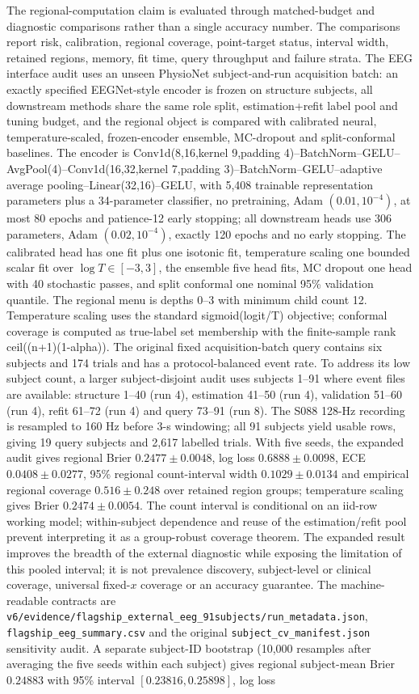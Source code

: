 \documentclass[11pt,a4paper]{article}
\numberwithin{equation}{section}
\theoremstyle{definition}\newtheorem{definition}[theorem]{Definition}
\theoremstyle{remark}\newtheorem{remark}[theorem]{Remark}
\begin{document}
The regional-computation claim is evaluated through matched-budget and diagnostic comparisons rather than a single accuracy number. The comparisons report risk, calibration, regional coverage, point-target status, interval width, retained regions, memory, fit time, query throughput and failure strata. The EEG interface audit uses an unseen PhysioNet subject-and-run acquisition batch: an exactly specified EEGNet-style encoder is frozen on structure subjects, all downstream methods share the same role split, estimation+refit label pool and tuning budget, and the regional object is compared with calibrated neural, temperature-scaled, frozen-encoder ensemble, MC-dropout and split-conformal baselines. The encoder is Conv1d(8,16,kernel 9,padding 4)--BatchNorm--GELU--AvgPool(4)--Conv1d(16,32,kernel 7,padding 3)--BatchNorm--GELU--adaptive average pooling--Linear(32,16)--GELU, with 5,408 trainable representation parameters plus a 34-parameter classifier, no pretraining, Adam $(0.01,10^{-4})$, at most 80 epochs and patience-12 early stopping; all downstream heads use 306 parameters, Adam $(0.02,10^{-4})$, exactly 120 epochs and no early stopping. The calibrated head has one fit plus one isotonic fit, temperature scaling one bounded scalar fit over $\log T\in[-3,3]$, the ensemble five head fits, MC dropout one head with 40 stochastic passes, and split conformal one nominal 95\% validation quantile. The regional menu is depths 0--3 with minimum child count 12. Temperature scaling uses the standard sigmoid(logit/T) objective; conformal coverage is computed as true-label set membership with the finite-sample rank ceil((n+1)(1-alpha)). The original fixed acquisition-batch query contains six subjects and 174 trials and has a protocol-balanced event rate. To address its low subject count, a larger subject-disjoint audit uses subjects 1--91 where event files are available: structure 1--40 (run 4), estimation 41--50 (run 4), validation 51--60 (run 4), refit 61--72 (run 4) and query 73--91 (run 8). The S088 128-Hz recording is resampled to 160 Hz before 3-s windowing; all 91 subjects yield usable rows, giving 19 query subjects and 2,617 labelled trials. With five seeds, the expanded audit gives regional Brier $0.2477\pm0.0048$, log loss $0.6888\pm0.0098$, ECE $0.0408\pm0.0277$, 95\% regional count-interval width $0.1029\pm0.0134$ and empirical regional coverage $0.516\pm0.248$ over retained region groups; temperature scaling gives Brier $0.2474\pm0.0054$. The count interval is conditional on an iid-row working model; within-subject dependence and reuse of the estimation/refit pool prevent interpreting it as a group-robust coverage theorem. The expanded result improves the breadth of the external diagnostic while exposing the limitation of this pooled interval; it is not prevalence discovery, subject-level or clinical coverage, universal fixed-$x$ coverage or an accuracy guarantee. The machine-readable contracts are \texttt{v6/evidence/flagship\_external\_eeg\_91subjects/run\_metadata.json}, \texttt{flagship\_eeg\_summary.csv} and the original \texttt{subject\_cv\_manifest.json} sensitivity audit. A separate subject-ID bootstrap (10,000 resamples after averaging the five seeds within each subject) gives regional subject-mean Brier $0.24883$ with 95\% interval $[0.23816,0.25898]$, log loss 
\end{document}

